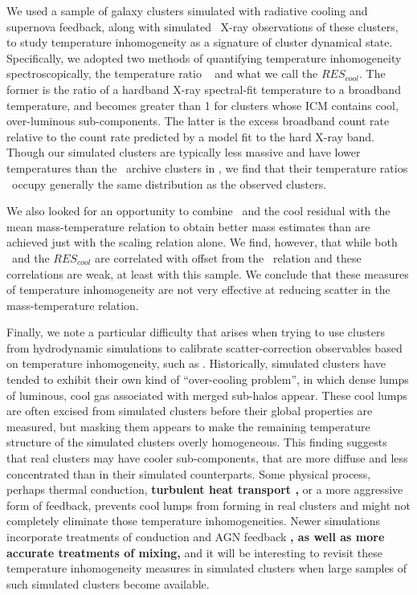\documentclass[12pt,preprint]{aastex}
\begin{document}
We used a sample of galaxy clusters simulated with radiative cooling
and supernova feedback, along with simulated \chandra\ X-ray
observations of these clusters, to study temperature inhomogeneity as
a signature of cluster dynamical state.  Specifically, we adopted two
methods of quantifying temperature inhomogeneity spectroscopically,
the temperature ratio \thbr\
\citep{mathiesen_four_2001,cavagnolo_bandpass_2008} and what we call
the $RES_{cool}$.  The former is the ratio of a hardband X-ray
spectral-fit temperature to a broadband temperature, and becomes
greater than 1 for clusters whose ICM contains cool, over-luminous
sub-components.  The latter is the excess broadband count rate
relative to the count rate predicted by a model fit to the hard X-ray
band.  Though our simulated clusters are typically less massive and
have lower temperatures than the \chandra\ archive clusters in
\cite{cavagnolo_bandpass_2008}, we find that their temperature ratios
\thbr\ occupy generally the same distribution as the observed
clusters.

We also looked for an opportunity to combine \thbr\ and the cool
residual with the mean mass-temperature relation to obtain better mass
estimates than are achieved just with the scaling relation alone.  We
find, however, that while both \thbr\ and the $RES_{cool}$ are
correlated with offset from the \mtx\ relation and these correlations are weak, at least with this sample. We conclude that
these measures of temperature inhomogeneity are not very effective at
reducing scatter in the mass-temperature relation.

Finally, we note a particular difficulty that arises when trying to
use clusters from hydrodynamic simulations to calibrate
scatter-correction observables based on temperature inhomogeneity,
such as \thbr.  Historically, simulated clusters have tended to
exhibit their own kind of ``over-cooling problem'', in which dense
lumps of luminous, cool gas associated with merged sub-halos appear.
These cool lumps are often excised from simulated clusters before
their global properties are measured, but masking them appears to make
the remaining temperature structure of the simulated clusters overly
homogeneous.  This finding suggests that real clusters may have cooler
sub-components, that are more diffuse and less concentrated than in
their simulated counterparts.  Some physical process, perhaps thermal
conduction, 
{\bf turbulent heat transport \citep[e.g.,][]{Dennis_Chandran_2005, Parrish_Quataert_Sharma_2010, Ruszkowski_Oh_2011},}
 or a more aggressive form of feedback, prevents cool lumps from forming in real clusters and might not completely eliminate those temperature inhomogeneities.  Newer simulations incorporate treatments of conduction and AGN feedback
{\bf, as well as more accurate treatments of mixing,}
and it will be interesting to revisit these temperature inhomogeneity measures in simulated clusters when large samples of such simulated clusters become available.
\end{document}
